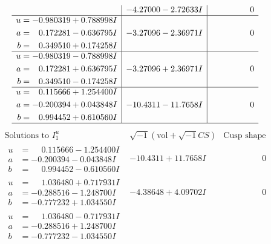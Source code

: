 \documentclass[1p]{elsarticle_modified}
\theoremstyle{definition}
\newcommand{\I}{\sqrt{-1}}
\begin{document}
$$\begin{array}{c|c|c}
 & -4.27000 - 2.72633 I & \phantom{-0.000000 } 0 \\ \hline\begin{aligned}
u &= -0.980319 + 0.788998 I \\
a &= \phantom{-}0.172281 - 0.636795 I \\
b &= \phantom{-}0.349510 + 0.174258 I\end{aligned}
 & -3.27096 - 2.36971 I & \phantom{-0.000000 } 0 \\ \hline\begin{aligned}
u &= -0.980319 - 0.788998 I \\
a &= \phantom{-}0.172281 + 0.636795 I \\
b &= \phantom{-}0.349510 - 0.174258 I\end{aligned}
 & -3.27096 + 2.36971 I & \phantom{-0.000000 } 0 \\ \hline\begin{aligned}
u &= \phantom{-}0.115666 + 1.254400 I \\
a &= -0.200394 + 0.043848 I \\
b &= \phantom{-}0.994452 + 0.610560 I\end{aligned}
 & -10.4311 - 11.7658 I & \phantom{-0.000000 } 0\\
 \hline 
 \end{array}$$\newpage$$\begin{array}{c|c|c}  
\text{Solutions to }I^u_{1}& \I (\text{vol} + \sqrt{-1}CS) & \text{Cusp shape}\\
 \hline 
\begin{aligned}
u &= \phantom{-}0.115666 - 1.254400 I \\
a &= -0.200394 - 0.043848 I \\
b &= \phantom{-}0.994452 - 0.610560 I\end{aligned}
 & -10.4311 + 11.7658 I & \phantom{-0.000000 } 0 \\ \hline\begin{aligned}
u &= \phantom{-}1.036480 + 0.717931 I \\
a &= -0.288516 - 1.248700 I \\
b &= -0.777232 + 1.034550 I\end{aligned}
 & -4.38648 + 4.09702 I & \phantom{-0.000000 } 0 \\ \hline\begin{aligned}
u &= \phantom{-}1.036480 - 0.717931 I \\
a &= -0.288516 + 1.248700 I \\
b &= -0.777232 - 1.034550 I\end{aligned}

\end{array}$$
\end{document}
